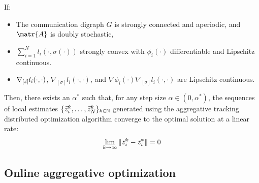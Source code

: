 \begin{description}
    \begin{theorem}
        If:
        \begin{itemize}
            \item The communication digraph $G$ is strongly connected and aperiodic, and $\matr{A}$ is doubly stochastic,
            \item $\sum_{i=1}^{N} l_i(\cdot, \sigma(\cdot))$ strongly convex with $\phi_i(\cdot)$ differentiable and Lipschitz continuous.
            \item $\nabla_{[{\vec{z}}]} l_i(\cdot, \cdot)$, $\nabla_{[\sigma]} l_i(\cdot, \cdot)$, and $\nabla \phi_i(\cdot) \nabla_{[\sigma]} l_i(\cdot, \cdot)$ are Lipschitz continuous.
        \end{itemize}
        Then, there exists an $\alpha^*$ such that, for any step size $\alpha \in (0, \alpha^*)$, the sequences of local estimates $\{ {\vec{z}}_i^k, \dots, {\vec{z}}_N^k \}_{k \in \mathbb{N}}$ generated using the aggregative tracking distributed optimization algorithm converge to the optimal solution at a linear rate:
        \[
            \lim_{k \rightarrow \infty} \Vert {\vec{z}}_i^k - {\vec{z}}_i^* \Vert = 0
        \]
    \end{theorem}



\end{description}


\subsection{Online aggregative optimization}

